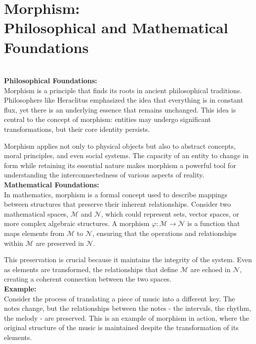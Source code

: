 \documentclass{article}
\begin{document}
\section*{Morphism:
\\
Philosophical and Mathematical Foundations}
\\

\textbf{Philosophical Foundations:}
\\

Morphism is a principle that finds its roots in ancient philosophical traditions. Philosophers like Heraclitus emphasized the idea that everything is in constant flux, yet there is an underlying essence that remains unchanged. This idea is central to the concept of morphism: entities may undergo significant transformations, but their core identity persists.

Morphism applies not only to physical objects but also to abstract concepts, moral principles, and even social systems. The capacity of an entity to change in form while retaining its essential nature makes morphism a powerful tool for understanding the interconnectedness of various aspects of reality.
\\

\textbf{Mathematical Foundations:}
\\

In mathematics, morphism is a formal concept used to describe mappings between structures that preserve their inherent relationships. Consider two mathematical spaces, \( \mathcal{M} \) and \( \mathcal{N} \), which could represent sets, vector spaces, or more complex algebraic structures. A morphism \( \varphi: \mathcal{M} \to \mathcal{N} \) is a function that maps elements from \( \mathcal{M} \) to \( \mathcal{N} \), ensuring that the operations and relationships within \( \mathcal{M} \) are preserved in \( \mathcal{N} \).

This preservation is crucial because it maintains the integrity of the system. Even as elements are transformed, the relationships that define \( \mathcal{M} \) are echoed in \( \mathcal{N} \), creating a coherent connection between the two spaces.
\\

\textbf{Example:}
\\

Consider the process of translating a piece of music into a different key. The notes change, but the relationships between the notes - the intervals, the rhythm, the melody - are preserved. This is an example of morphism in action, where the original structure of the music is maintained despite the transformation of its elements.
\\
\end{document}
